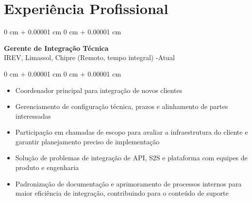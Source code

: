 \documentclass[10pt, letterpaper]{article}
\newenvironment{highlights}{
    \begin{itemize}[
        topsep=0.10 cm,
        parsep=0.10 cm,
        partopsep=0pt,
        itemsep=0pt,
        leftmargin=0 cm + 10pt
    ]
}{
    \end{itemize}
}
\newenvironment{onecolentry}{
    \begin{adjustwidth}{
        0 cm + 0.00001 cm
    }{
        0 cm + 0.00001 cm
    }
}{
    \end{adjustwidth}
}
\begin{document}
\section{Experiência Profissional}

\begin{onecolentry}
    \setcolumnwidth{\fill, 4.5cm}
    \begin{paracol}{2}
        \textbf{Gerente de Integração Técnica} \\ IREV, Limassol, Chipre (Remoto, tempo integral)
        \switchcolumn
        -Atual
    \end{paracol}
\end{onecolentry}
\vspace{0.10cm}
\begin{onecolentry}
    \begin{highlights}
                \item Coordenador principal para integração de novos clientes
                \item Gerenciamento de configuração técnica, prazos e alinhamento de partes interessadas
                \item Participação em chamadas de escopo para avaliar a infraestrutura do cliente e garantir planejamento preciso de implementação
                \item Solução de problemas de integração de API, S2S e plataforma com equipes de produto e engenharia
                \item Padronização de documentação e aprimoramento de processos internos para maior eficiência de integração, contribuindo para o conteúdo de suporte
    \end{highlights}
\end{onecolentry}

\vspace{0.2cm}
\end{document}

